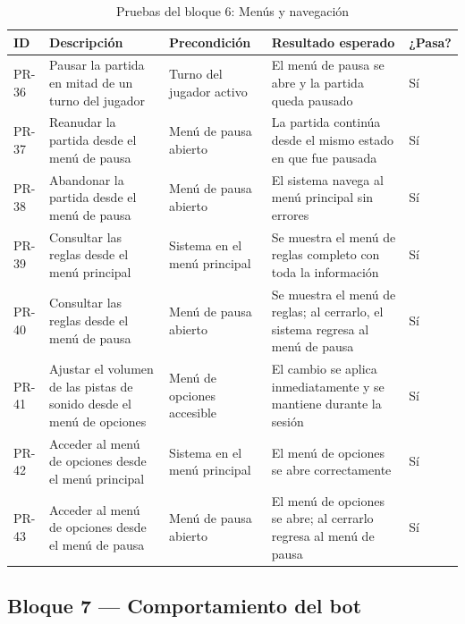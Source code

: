 \begin{table}[H]
	\centering
	\small
	\begin{tabular}{|>{\centering\arraybackslash}p{1cm}|>{\centering\arraybackslash}p{4cm}|>{\centering\arraybackslash}p{4cm}|>{\centering\arraybackslash}p{4cm}|>{\centering\arraybackslash}p{1.5cm}|}
		\hline
		\textbf{ID} & \textbf{Descripción} & \textbf{Precondición} & \textbf{Resultado esperado} & \textbf{¿Pasa?} \\
		\hline
		PR-36 & Pausar la partida en mitad de un turno del jugador & Turno del jugador activo & El menú de pausa se abre y la partida queda pausado & \cellcolor{green!40}Sí \\
		\hline
		PR-37 & Reanudar la partida desde el menú de pausa & Menú de pausa abierto & La partida continúa desde el mismo estado en que fue pausada & \cellcolor{green!40}Sí \\
		\hline
		PR-38 & Abandonar la partida desde el menú de pausa & Menú de pausa abierto & El sistema navega al menú principal sin errores & \cellcolor{green!40}Sí \\
		\hline
		PR-39 & Consultar las reglas desde el menú principal & Sistema en el menú principal & Se muestra el menú de reglas completo con toda la información & \cellcolor{green!40}Sí \\
		\hline
		PR-40 & Consultar las reglas desde el menú de pausa & Menú de pausa abierto & Se muestra el menú de reglas; al cerrarlo, el sistema regresa al menú de pausa & \cellcolor{green!40}Sí \\
		\hline
		PR-41 & Ajustar el volumen de las pistas de sonido desde el menú de opciones & Menú de opciones accesible & El cambio se aplica inmediatamente y se mantiene durante la sesión & \cellcolor{green!40}Sí \\
		\hline
		PR-42 & Acceder al menú de opciones desde el menú principal & Sistema en el menú principal & El menú de opciones se abre correctamente & \cellcolor{green!40}Sí \\
		\hline
		PR-43 & Acceder al menú de opciones desde el menú de pausa & Menú de pausa abierto & El menú de opciones se abre; al cerrarlo regresa al menú de pausa & \cellcolor{green!40}Sí \\
		\hline
	\end{tabular}
	\caption{Pruebas del bloque 6: Menús y navegación}
\end{table}

\clearpage

\subsection{Bloque 7 — Comportamiento del bot}


